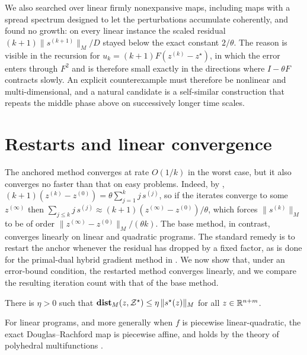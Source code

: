 We also searched over linear firmly nonexpansive maps, including maps with a spread spectrum designed to let the perturbations accumulate coherently, and found no growth: on every linear instance the scaled residual $(k+1)\|s^{(k+1)}\|_M/D$ stayed below the exact constant $2/\theta$.
The reason is visible in the recursion for $u_k = (k+1)F(z^{(k)} - z^\star)$, in which the error enters through $F^2$ and is therefore small exactly in the directions where $I - \theta F$ contracts slowly.
An explicit counterexample must therefore be nonlinear and multi-dimensional, and a natural candidate is a self-similar construction that repeats the middle phase above on successively longer time scales.

\section{Restarts and linear convergence}\label{sec:acc-restart}
The anchored method converges at rate $O(1/k)$ in the worst case, but it also converges no faster than that on easy problems.
Indeed, by , $(k+1)(z^{(k)} - z^{(0)}) = \theta\sum_{j=1}^{k} j\, s^{(j)}$, so if the iterates converge to some $z^{(\infty)}$ then $\sum_{j \le k} j\, s^{(j)} \approx (k+1)(z^{(\infty)} - z^{(0)})/\theta$, which forces $\|s^{(k)}\|_M$ to be of order $\|z^{(\infty)} - z^{(0)}\|_M/(\theta k)$.
The base method, in contrast, converges linearly on linear and quadratic programs.
The standard remedy is to restart the anchor whenever the residual has dropped by a fixed factor, as is done for the primal-dual hybrid gradient method in \citet{lu2024restarted}.
We now show that, under an error-bound condition, the restarted method converges linearly, and we compare the resulting iteration count with that of the base method.

\begin{assumption}\label{ass:acc-error-bound}
    There is $\eta > 0$ such that $\mathop{\bf dist{}}_M(z, \mathcal{Z}^\star) \le \eta\,\|s^\star(z)\|_M$ for all $z \in \mathbb{R}^{n+m}$.
\end{assumption}
For linear programs, and more generally when $f$ is piecewise linear-quadratic, the exact Douglas--Rachford map is piecewise affine, and  holds by the theory of polyhedral multifunctions \citep{robinson1981polyhedral}.

